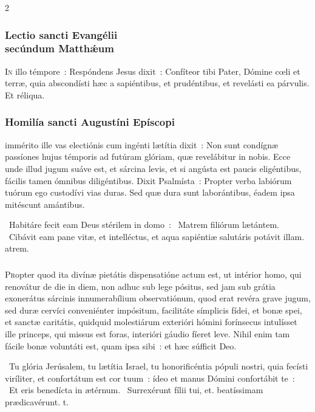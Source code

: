 \documentclass[9pt,twoside]{extarticle}
\begin{document}
\begin{multicols}{2}
\subsubsection*{\center \normalfont Lectio sancti Evangélii\\ secúndum Matthǽum\\
}
\lettrine{I}n illo témpore~: Respóndens Jesus dixit~: Confíteor tibi Pater, Dómine cœli et terræ, quia abscondísti hæc a sapiéntibus, et prudéntibus, et revelásti ea párvulis. Et réliqua.

\subsubsection*{\center \normalfont Homilía sancti Augustíni Epíscopi\\
\small {}}

 immérito ille vas electiónis cum ingénti lætítia dixit~: Non sunt condígnæ passíones hujus témporis ad futúram glóriam, quæ revelábitur in nobis. Ecce unde illud jugum suáve est, et sárcina levis, et si angústa est paucis eligéntibus, fácilis tamen ómnibus diligéntibus. Dixit Psalmísta~: Propter verba labiórum tuórum ego custodívi vias duras. Sed quæ dura sunt laborántibus, éadem ipsa mitéscunt amántibus.

~Habitáre fecit eam Deus stérilem in domo~: \textred{*}~Matrem filiórum lætántem. ~Cibávit eam pane vitæ, et intelléctus, et aqua sapiéntiæ salutáris potávit illam. atrem.

\subsubsection*{\center \normalfont {}}
\lettrine{P}ropter quod ita divínæ pietátis dispensatióne actum est, ut intérior homo, qui renovátur de die in diem, non adhuc sub lege pósitus, sed jam sub grátia exonerátus sárcinis innumerabílium observatiónum, quod erat revéra grave jugum, sed duræ cervíci conveniénter impósitum, facilitáte símplicis fídei, et bonæ spei, et sanctæ caritátis, quidquid molestiárum exterióri hómini forínsecus intulísset ille princeps, qui missus est foras, interióri gáudio fíeret leve. Nihil enim tam fácile bonæ voluntáti est, quam ipsa sibi~: et hæc súfficit Deo.

~Tu glória Jerúsalem, tu lætítia Israel, tu honorificéntia pópuli nostri, quia fecísti viríliter, et confortátum est cor tuum~: ídeo et manus Dómini confortábit te~: \textred{*}~Et eris benedícta in ætérnum. ~Surrexérunt fílii tui, et. beatíssimam prædicavérunt. t.


\end{multicols}
\end{document}
